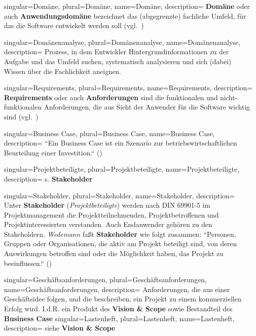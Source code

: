 {
singular={Domäne},
plural={Domäne},
name={Domäne},
description={
\textbf{Domäne} oder auch \textbf{Anwendungsdomäne} bezeichnet das (abgegrenzte) fachliche Umfeld, für das die Software entwickelt werden soll (vgl.~\cite[41]{Wed09})
}
}

{
singular={Domänenanalyse},
plural={Domänenanalyse},
name={Domänenanalyse},
description={
Prozess, in dem Entwickler Hintergrundinformationen zu der Aufgabe und das Umfeld suchen, systematisch analysieren und sich (dabei) Wissen über die Fachlichkeit aneignen.
}
}


{
singular={Requirements},
plural={Requirements},
name={Requirements},
description={
\textbf{Requirements} oder auch \textbf{Anforderungen} sind die funktionalen und nicht-funktionalen Anforderungen, die aus Sicht der Anwender für die Software wichtig sind  (vgl.~\cite[41]{Wed09})
}
}

{
singular={Business Case},
plural={Business Case},
name={Business Case},
description={
``Ein Business Case ist ein Szenario zur betriebswirtschaftlichen Beurteilung einer Investition.`` (\cite[11]{Brug09})
}
}

{
singular={Projektbeteiligte},
plural={Projektbeteiligte},
name={Projektbeteiligte},
description={
s. \textbf{Stakeholder}
}
}



{
singular={Stakeholder},
plural={Stakeholder},
name={Stakeholder},
description={
Unter \textbf{Stakeholder} (\textit{Projektbeteiligte}) werden nach DIN 69901-5 im Projektmanagement die Projektteilnehmenden,
Projektbetroffenen und Projektinteressierten verstanden.
Auch Endanwender gehören zu den Stakeholdern.
\textit{Wedemann} faßt \textbf{Stakeholder} wie folgt zusammen: ``Personen, Gruppen oder Organisationen, die aktiv am Projekt beteiligt sind, von deren Auswirkungen betroffen sind oder die Möglichkeit haben, das Projekt zu beeinflussen.`` (\cite[49]{Wed09})\\
}
}


{
singular={Geschäftsanforderungen},
plural={Geschäftsanforderungen},
name={Geschäftsanforderungen},
description={
Anforderungen, die aus einer Geschäftsidee folgen, und die beschreiben, ein Projekt zu einem kommerziellen Erfolg wird. I.d.R. ein Produkt des \textbf{Vision \& Scope} sowie Bestandteil des \textbf{Business Case}
}
}
{
singular={Lastenheft},
plural={Lastenheft},
name={Lastenheft},
description={
siehe \textbf{Vision \& Scope}
}
}


